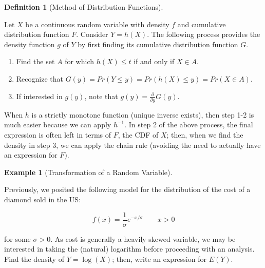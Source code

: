 \documentclass[
  letterpaper,
  DIV=11,
  numbers=noendperiod]{scrreprt}
\providecommand{\tightlist}{%
  \setlength{\itemsep}{0pt}\setlength{\parskip}{0pt}}\usepackage{longtable,booktabs,array}
\theoremstyle{definition}
\newtheorem{definition}{Definition}[chapter]
\theoremstyle{plain}
\theoremstyle{definition}
\newtheorem{example}{Example}[chapter]
\theoremstyle{remark}
\begin{document}
\begin{definition}[Method of Distribution
Functions]\protect\hypertarget{def-method-of-distribution-functions}{}\label{def-method-of-distribution-functions}

Let \(X\) be a continuous random variable with density \(f\) and
cumulative distribution function \(F\). Consider \(Y = h(X)\). The
following process provides the density function \(g\) of \(Y\) by first
finding its cumulative distribution function \(G\).

\begin{enumerate}
\def\labelenumi{\arabic{enumi}.}
\tightlist
\item
  Find the set \(A\) for which \(h(X) \leq t\) if and only if
  \(X \in A\).
\item
  Recognize that
  \(G(y) = Pr(Y \leq y) = Pr\left(h(X) \leq y\right) = Pr(X \in A)\).
\item
  If interested in \(g(y)\), note that
  \(g(y) = \frac{\partial}{\partial y} G(y)\).
\end{enumerate}

\end{definition}

When \(h\) is a strictly monotone function (unique inverse exists), then
step 1-2 is much easier because we can apply \(h^{-1}\). In step 2 of
the above process, the final expression is often left in terms of \(F\),
the CDF of \(X\); then, when we find the density in step 3, we can apply
the chain rule (avoiding the need to actually have an expression for
\(F\)).

\begin{example}[Transformation of a Random
Variable]\protect\hypertarget{exm-transformations}{}\label{exm-transformations}

Previously, we posited the following model for the distribution of the
cost of a diamond sold in the US:

\[f(x) = \frac{1}{\sigma} e^{-x/\sigma} \qquad x > 0\]

for some \(\sigma > 0\). As cost is generally a heavily skewed variable,
we may be interested in taking the (natural) logarithm before proceeding
with an analysis. Find the density of \(Y = \log(X)\); then, write an
expression for \(E(Y)\).

\end{example}
\end{document}
